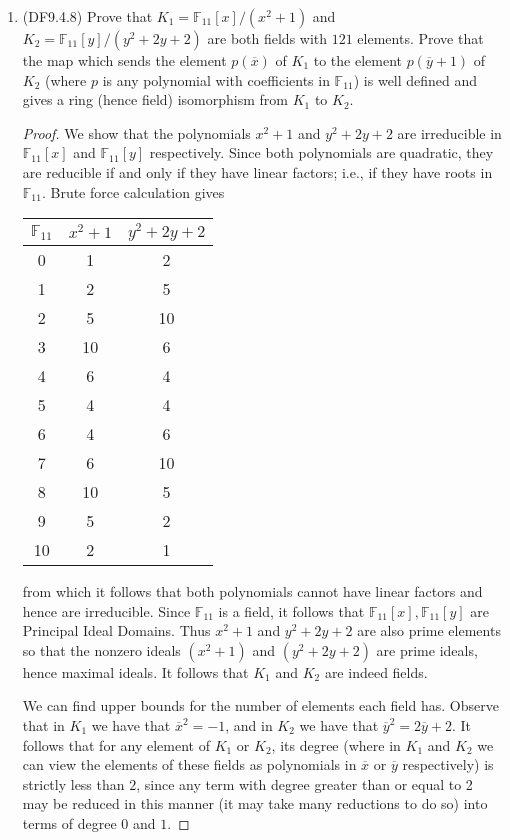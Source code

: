 \documentclass[11pt]{article}
\begin{document}
\begin{enumerate}
    \item (DF9.4.8) Prove that $K_1 = \mathbb{F}_{11}[x]/(x^2+1)$ and $K_2 = \mathbb{F}_{11}[y]/(y^2+2y+2)$ are both fields with $121$ elements. Prove that the map which sends the element $p(\overline{x})$ of $K_1$ to the element $p(\overline{y}+1)$ of $K_2$ (where $p$ is any polynomial with coefficients in $\mathbb{F}_{11}$) is well defined and gives a ring (hence field) isomorphism from $K_1$ to $K_2$. \begin{proof}
      We show that the polynomials $x^2+1$ and $y^2+2y+2$ are irreducible in $\mathbb{F}_{11}[x]$ and $\mathbb{F}_{11}[y]$ respectively. Since both polynomials are quadratic, they are reducible if and only if they have linear factors; i.e., if they have roots in $\mathbb{F}_{11}$. Brute force calculation gives \begin{table}[h]
        \centering
        \begin{tabular}{c|c|c}
        $\mathbb{F}_{11}$ & $x^2+1$ & $y^2+2y+2$\\
        \hline
         0 & 1 & 2\\
         1 & 2 & 5\\
         2 & 5 & 10\\
         3 & 10 & 6\\
         4 & 6 & 4\\
         5 & 4 & 4\\
         6 & 4 & 6\\
         7 & 6 & 10\\
         8 & 10 & 5\\
         9 & 5 & 2\\
         10 & 2 & 1\\
        \end{tabular}
        \end{table} from which it follows that both polynomials cannot have linear factors and hence are irreducible. Since $\mathbb{F}_{11}$ is a field, it follows that $\mathbb{F}_{11}[x],\mathbb{F}_{11}[y]$ are Principal Ideal Domains. Thus $x^2+1$ and $y^2+2y+2$ are also prime elements so that the nonzero ideals $(x^2+1)$ and $(y^2+2y+2)$ are prime ideals, hence maximal ideals. It follows that $K_1$ and $K_2$ are indeed fields.
        
        We can find upper bounds for the number of elements each field has. Observe that in $K_1$ we have that $\overline{x}^2 = -1$, and in $K_2$ we have that $\overline{y}^2 = 2\overline{y}+2$. It follows that for any element of $K_1$ or $K_2$, its degree (where in $K_1$ and $K_2$ we can view the elements of these fields as polynomials in $\overline{x}$ or $\overline{y}$ respectively) is strictly less than $2$, since any term with degree greater than or equal to 2 may be reduced in this manner (it may take many reductions to do so) into terms of degree $0$ and $1$. 


\end{proof}
\end{enumerate}
\end{document}
